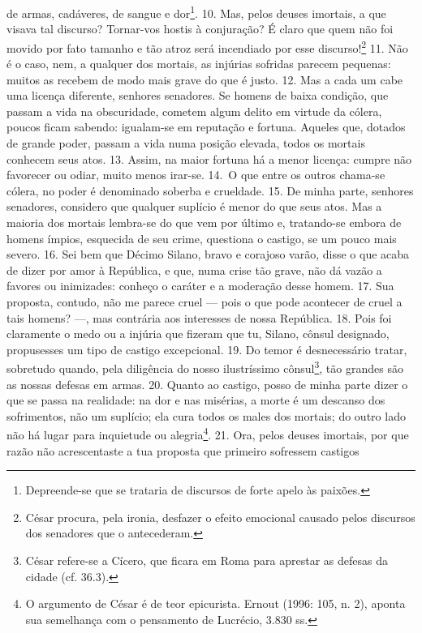 de armas, cadáveres, de sangue e dor\footnote{Depreende-se que se trataria de
discursos de forte apelo às paixões.}. 10. Mas, pelos deuses imortais, a que
visava tal discurso? Tornar-vos hostis à conjuração? É claro que quem não foi
movido por fato tamanho e tão atroz será incendiado por esse
discurso!\footnote{César procura, pela ironia, desfazer o efeito emocional causado pelos
discursos dos senadores que o antecederam.} 11. Não é o caso, nem, a qualquer
dos mortais, as injúrias sofridas parecem pequenas: muitos as recebem de modo
mais grave do que é justo. 12. Mas a cada um cabe uma licença diferente,
senhores senadores. Se homens de baixa condição, que passam a vida na
obscuridade, cometem algum delito em virtude da cólera, poucos ficam sabendo:
igualam-se em reputação e fortuna. Aqueles que, dotados de grande poder, passam
a vida numa posição elevada, todos os mortais conhecem seus atos. 13. Assim, na
maior fortuna há a menor licença: cumpre não favorecer ou odiar, muito menos
irar-se. 14.~O que entre os outros chama-se cólera, no poder é denominado
soberba e crueldade. 15. De minha parte, senhores senadores, considero que
qualquer suplício é menor do que seus atos. Mas a maioria dos mortais lembra-se
do que vem por último e, tratando-se embora de homens ímpios, esquecida de seu
crime, questiona o castigo, se um pouco mais severo. 16. Sei bem que Décimo
Silano, bravo e corajoso varão, disse o que acaba de dizer por amor à
República, e que, numa crise tão grave, não dá vazão a favores ou inimizades:
conheço o caráter e a moderação desse homem. 17. Sua proposta, contudo, não me
parece cruel --- pois o que pode acontecer de cruel a tais homens? ---, mas
contrária aos interesses de nossa República. 18. Pois foi claramente o medo ou
a injúria que fizeram que tu, Silano,  cônsul designado, propusesses um tipo de
castigo excepcional. 19. Do temor é desnecessário tratar, sobretudo quando,
pela diligência do nosso ilustríssimo cônsul\footnote{César refere-se a Cícero,
que ficara em Roma para aprestar as defesas da cidade (cf. 36.3).}, tão
grandes são as nossas defesas em armas. 20. Quanto ao castigo, posso de minha
parte dizer o que se passa na realidade: na dor e nas misérias, a morte é um
descanso dos sofrimentos, não um suplício; ela cura todos os males dos mortais;
do outro lado não há lugar para inquietude ou alegria\footnote{O argumento de
César é de teor epicurista. Ernout (1996: 105, n. 2), aponta sua semelhança com o 
pensamento  de Lucrécio, 3.830 ss.}. 21. Ora, pelos deuses imortais, por que
razão não acrescentaste a tua proposta que primeiro sofressem castigos
